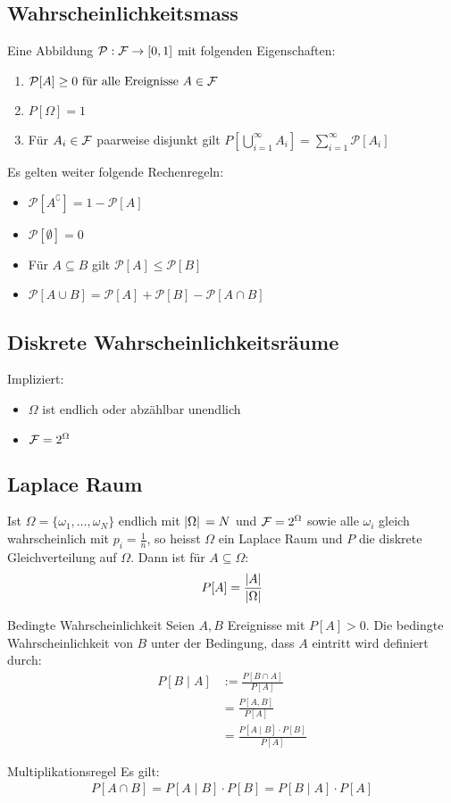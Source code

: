 \subsection{Wahrscheinlichkeitsmass}
Eine Abbildung $\mathcal{P}: \mathcal{F} \to [0, 1]$ mit folgenden Eigenschaften:
\begin{enumerate}[label= (\arabic*)]
  \item $\mathcal{P}[A] \geq 0 \text{ für alle Ereignisse } A \in \mathcal{F}$
  \item $P[\Omega] = 1$
  \item Für $A_i \in \mathcal{F}$ paarweise disjunkt gilt $P[\bigcup_{i = 1}^\infty A_i] =
          \sum_{i = 1}^\infty \mathcal{P}[A_i]$
\end{enumerate}
Es gelten weiter folgende Rechenregeln:
\begin{itemize}
  \item $\mathcal{P}[A^\complement] = 1 - \mathcal{P}[A]$
  \item $\mathcal{P}[\emptyset] = 0$
  \item Für $A \subseteq B$ gilt $\mathcal{P}[A] \leq \mathcal{P}[B]$
  \item $\mathcal{P}[A \cup B] = \mathcal{P}[A] + \mathcal{P}[B] - \mathcal{P}[A \cap B]$
\end{itemize}
\subsection{Diskrete Wahrscheinlichkeitsräume}
Impliziert:
\begin{itemize}
  \item $\Omega$ ist endlich oder abzählbar unendlich
  \item $\mathcal{F} = 2^{\Omega}$
\end{itemize}
\subsection{Laplace Raum}
Ist $\Omega = \{\omega_1, \dots, \omega_N\}$ endlich mit $\abs*{\Omega} = N$
und $\mathcal{F} = 2^\Omega$ sowie alle $\omega_i$ gleich wahrscheinlich mit $p_i =
  \frac{1}{n}$, so heisst $\Omega$ ein Laplace Raum und $P$ die diskrete
Gleichverteilung auf $\Omega$. Dann ist für $A \subseteq \Omega$:
\begin{align*}
  P[A] = \frac{\abs{A}}{\abs{\Omega}}
\end{align*}
\begin{definition}{Bedingte Wahrscheinlichkeit}
Seien $A, B$ Ereignisse mit $P[A] > 0$. Die bedingte Wahrscheinlichkeit von $B$
unter der Bedingung, dass $A$ eintritt wird definiert durch:
\begin{align*}
  P[B \;|\; A] & := \frac{P[B \cap A]}{P[A]} \\
               & = \frac{P[A, B]}{P[A]}\\
               & = \frac{P[A \;|\; B] \cdot P[B]}{P[A]}
\end{align*}
\end{definition}
\begin{definition}{Multiplikationsregel}
Es gilt:
\begin{align*}
  P[A \cap B] = P[A \;|\; B] \cdot P[B] = P[B \;|\; A] \cdot P[A]
\end{align*}
\end{definition}
